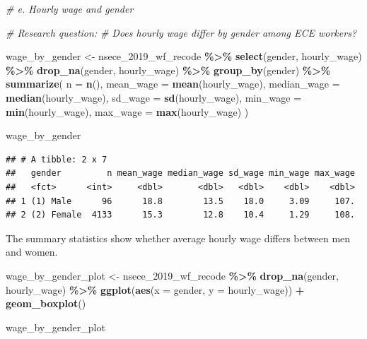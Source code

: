 \documentclass[
]{article}
\newenvironment{Shaded}{\begin{snugshade}}{\end{snugshade}}
\newcommand{\AttributeTok}[1]{\textcolor[rgb]{0.13,0.29,0.53}{#1}}
\newcommand{\CommentTok}[1]{\textcolor[rgb]{0.56,0.35,0.01}{\textit{#1}}}
\newcommand{\FunctionTok}[1]{\textcolor[rgb]{0.13,0.29,0.53}{\textbf{#1}}}
\newcommand{\NormalTok}[1]{#1}
\newcommand{\OtherTok}[1]{\textcolor[rgb]{0.56,0.35,0.01}{#1}}
\newcommand{\SpecialCharTok}[1]{\textcolor[rgb]{0.81,0.36,0.00}{\textbf{#1}}}
\begin{document}
\begin{Shaded}
\begin{Highlighting}[]
\CommentTok{\# e. Hourly wage and gender}

\CommentTok{\# Research question:}
\CommentTok{\# Does hourly wage differ by gender among ECE workers?}

\NormalTok{wage\_by\_gender }\OtherTok{\textless{}{-}}
\NormalTok{  nsece\_2019\_wf\_recode }\SpecialCharTok{\%\textgreater{}\%}
  \FunctionTok{select}\NormalTok{(gender, hourly\_wage) }\SpecialCharTok{\%\textgreater{}\%}
  \FunctionTok{drop\_na}\NormalTok{(gender, hourly\_wage) }\SpecialCharTok{\%\textgreater{}\%}
  \FunctionTok{group\_by}\NormalTok{(gender) }\SpecialCharTok{\%\textgreater{}\%}
  \FunctionTok{summarize}\NormalTok{(}
    \AttributeTok{n =} \FunctionTok{n}\NormalTok{(),}
    \AttributeTok{mean\_wage =} \FunctionTok{mean}\NormalTok{(hourly\_wage),}
    \AttributeTok{median\_wage =} \FunctionTok{median}\NormalTok{(hourly\_wage),}
    \AttributeTok{sd\_wage =} \FunctionTok{sd}\NormalTok{(hourly\_wage),}
    \AttributeTok{min\_wage =} \FunctionTok{min}\NormalTok{(hourly\_wage),}
    \AttributeTok{max\_wage =} \FunctionTok{max}\NormalTok{(hourly\_wage)}
\NormalTok{  )}

\NormalTok{wage\_by\_gender}
\end{Highlighting}
\end{Shaded}

\begin{verbatim}
## # A tibble: 2 x 7
##   gender         n mean_wage median_wage sd_wage min_wage max_wage
##   <fct>      <int>     <dbl>       <dbl>   <dbl>    <dbl>    <dbl>
## 1 (1) Male      96      18.8        13.5    18.0     3.09     107.
## 2 (2) Female  4133      15.3        12.8    10.4     1.29     108.
\end{verbatim}

The summary statistics show whether average hourly wage differs between
men and women.

\begin{Shaded}
\begin{Highlighting}[]
\NormalTok{wage\_by\_gender\_plot }\OtherTok{\textless{}{-}}
\NormalTok{  nsece\_2019\_wf\_recode }\SpecialCharTok{\%\textgreater{}\%}
  \FunctionTok{drop\_na}\NormalTok{(gender, hourly\_wage) }\SpecialCharTok{\%\textgreater{}\%}
  \FunctionTok{ggplot}\NormalTok{(}\FunctionTok{aes}\NormalTok{(}\AttributeTok{x =}\NormalTok{ gender, }\AttributeTok{y =}\NormalTok{ hourly\_wage)) }\SpecialCharTok{+}
  \FunctionTok{geom\_boxplot}\NormalTok{()}

\NormalTok{wage\_by\_gender\_plot}
\end{Highlighting}
\end{Shaded}
\end{document}
